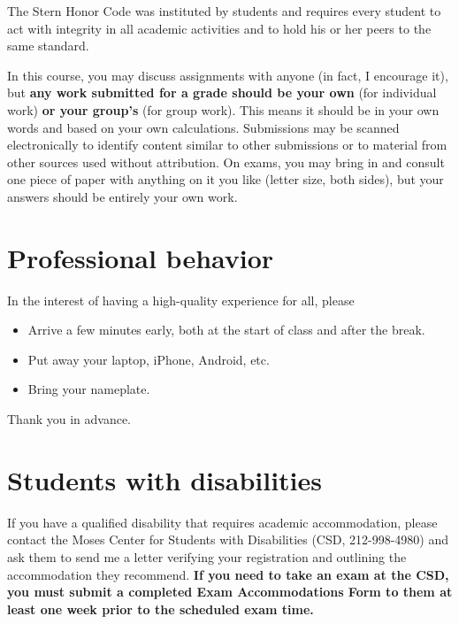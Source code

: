 \documentclass[12pt]{article}
\begin{document}
The Stern Honor Code was instituted by students
and requires every student to act with integrity in all
academic activities and to hold his or her peers to the same
standard.

In this course, you may discuss assignments with anyone
(in fact, I encourage it), but {\bf any work submitted for a
grade should be your own} (for individual work) {\bf or your group's}
(for group work).
This means it should be in your own words and based on your own calculations.
Submissions may be scanned electronically to identify
content similar to other submissions or to material from other sources
used without attribution.
On exams, you may bring in and consult one piece
of paper with anything on it you like (letter size, both sides),
but your answers should be entirely your own work.




\section{Professional behavior}

In the interest of having a high-quality experience for all,
please
%
\begin{itemize}
\item Arrive a few minutes early,
both at the start of class and after the break.

\item Put away your laptop, iPhone, Android, etc.

\item Bring your nameplate.

%
\end{itemize}
Thank you in advance.


\section{Students with disabilities}

If you have a qualified disability that requires academic accommodation,
please contact the Moses Center for Students with Disabilities (CSD, 212-998-4980) and ask them to
send me a letter verifying your registration and outlining the accommodation they recommend.
{\bf If you need to take an exam at the CSD,
you must submit a completed Exam Accommodations Form to them
at least one week prior to the scheduled exam time.}


\end{document}
